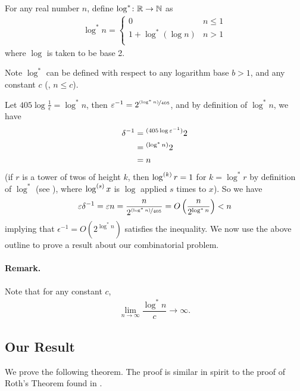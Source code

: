 \begin{definition}[$\log^* n$]\label{def:logstar}
	For any real number $n$, define $\log^*\colon \bbR \rightarrow \bbN$ as
	\begin{align*}
	\log^*n = \begin{cases}
	0 & n \leq 1\\
	1 + \log^* (\log n) & n > 1\\
	\end{cases}
	\end{align*}
	where $\log$ is taken to be base 2.
\end{definition}

\noindent Note $\log^*$ can be defined with respect to any logarithm base $b > 1$, and any constant $c$ (\ie, $n \leq c$).

Let $405\log \frac{1}{\epsilon} = \log^* n$, then $\epsilon^{-1} = 2^{\nicefrac{(\log^* n)}{405}}$, and by definition of $\log^* n$, we have 
\begin{align*}
	\delta^{-1} &= \prescript{(405\log\epsilon^{-1})}{}{2}\\
	&=\prescript{(\log^* n)}{}{2}\\
	&= n
\end{align*}
(if $r$ is a tower of twos of height $k$, then $\log\p{k} r = 1$ for $k = \log^* r$ by definition of $\log^*$ (see ), where $\log\p{s} x$ is $\log$ applied $s$ times to $x$). So we have
\begin{align*}
\epsilon \delta^{-1} = \epsilon n = \dfrac{n}{2^{\nicefrac{(\log^* n)}{405}}} = O\left(\dfrac{n}{2^{\log^* n}}\right) < n
\end{align*}
implying that $\epsilon^{-1} = O\left(2^{\log^* n}\right)$ satisfies the inequality. We now use the above outline to prove a result about our combinatorial problem.

\paragraph{Remark.} Note that for any constant $c$,
\begin{align*}
	\lim_{n \to \infty} \dfrac{\log^* n}{c} \to \infty.
\end{align*}

\subsection{Our Result}

We prove the following theorem. The proof is similar in spirit to the proof of Roth's Theorem found in \cite{Verstraete}.


